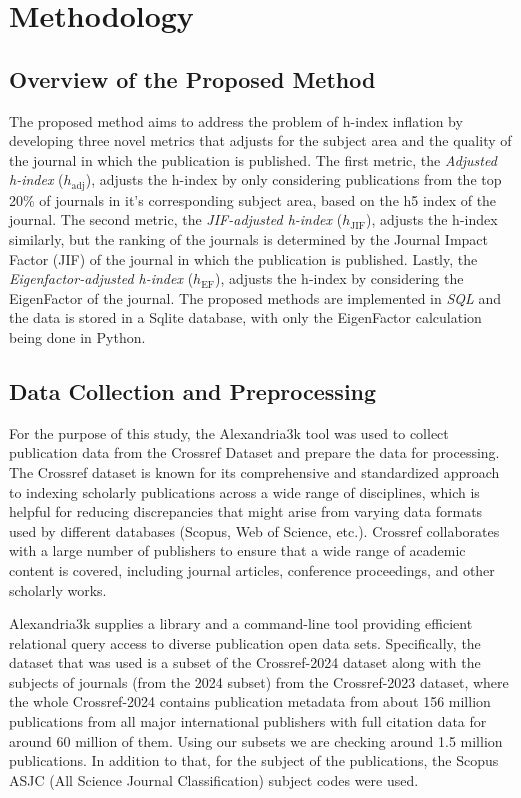 \chapter{Methodology}
\label{ch:methods}

\section{Overview of the Proposed Method}

The proposed method aims to address the problem of h-index inflation by
developing three novel metrics that adjusts for the subject area and the quality
of the journal in which the publication is published. The first metric, the
\textit{Adjusted h-index} ($h_{\text{adj}}$), adjusts the h-index by only
considering publications from the top 20\% of journals in it's corresponding
subject area, based on the h5 index of the journal. The second metric, the
\textit{JIF-adjusted h-index} ($h_{\text{JIF}}$), adjusts the h-index
similarly, but the ranking of the journals is determined by the Journal Impact
Factor (JIF) of the journal in which the publication is published. Lastly, 
the \textit{Eigenfactor-adjusted h-index} ($h_{\text{EF}}$),
adjusts the h-index by considering the EigenFactor of the journal.
The proposed methods are implemented in \emph{SQL}
and the data is stored in a Sqlite database, with only the EigenFactor
calculation being done in Python.

\section{Data Collection and Preprocessing}

For the purpose of this study, the Alexandria3k \cite{Spi23g} tool was used to
collect publication data from the Crossref Dataset \cite{Crossref2020} and
prepare the data for processing. The Crossref dataset is known for its
comprehensive and standardized approach to indexing scholarly publications
across a wide range of disciplines, which is helpful for reducing discrepancies
that might arise from varying data formats used by different databases (Scopus,
Web of Science, etc.). Crossref collaborates with a large number of publishers
to ensure that a wide range of academic content is covered, including journal
articles, conference proceedings, and other scholarly works.

Alexandria3k supplies a library and a command-line tool providing efficient
relational query access to diverse publication open data sets. Specifically,
the dataset that was used is a subset of the Crossref-2024 dataset along with the subjects of
journals (from the 2024 subset) from the Crossref-2023 dataset, where the whole 
Crossref-2024 contains publication metadata from about
156 million publications from all major international publishers with full
citation data for around 60 million of them. Using our subsets we are checking
around 1.5 million publications. In addition to that, for the subject of the
publications, the Scopus ASJC (All Science Journal Classification) subject
codes were used.

